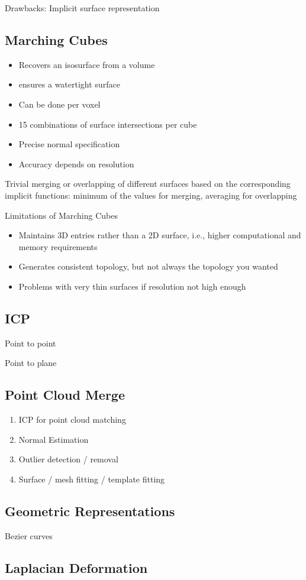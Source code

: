 Drawbacks: Implicit surface representation

\subsection{Marching Cubes}
\begin{itemize}
\item Recovers an isosurface from a volume
\item ensures a watertight surface
\item Can be done per voxel
\item 15 combinations of surface intersections per cube
\item Precise normal specification
\item Accuracy depends on resolution
\end{itemize}

Trivial merging or overlapping of different surfaces based on the corresponding implicit functions:
minimum of the values for merging, averaging for overlapping

Limitations of Marching Cubes
\begin{itemize}
\item  Maintains 3D entries rather than a 2D surface, i.e., higher computational and memory requirements
\item  Generates consistent topology, but not always the topology you wanted
\item  Problems with very thin surfaces if resolution not high enough
\end{itemize}

\subsection{ICP}

Point to point

Point to plane

\subsection{Point Cloud Merge}

\begin{enumerate}
\item ICP for point cloud matching
\item Normal Estimation
\item Outlier detection / removal 
\item Surface / mesh fitting / template fitting
\end{enumerate}

\subsection{Geometric Representations}

Bezier curves

\subsection{Laplacian Deformation}